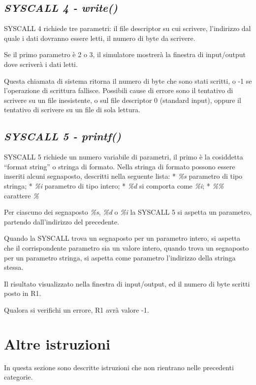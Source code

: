 \documentclass[letterpaper,10pt,italian]{sphinxmanual}
\begin{document}
\subsection{\emph{SYSCALL 4 - write()}}
\label{instructions:syscall-4-write}
SYSCALL 4 richiede tre parametri: il file descriptor su cui scrivere,
l'indirizzo dal quale i dati dovranno essere letti, il numero di byte da
scrivere.

Se il primo parametro è 2 o 3, il simulatore mostrerà la finestra di
input/output dove scriverà i dati letti.

Questa chiamata di sistema ritorna il numero di byte che sono stati scritti, o
-1 se l'operazione di scrittura fallisce.  Possibili cause di errore sono il
tentativo di scrivere su un file inesistente, o sul file descriptor 0
(standard input), oppure il tentativo di scrivere su un file di sola lettura.


\subsection{\emph{SYSCALL 5 - printf()}}
\label{instructions:syscall-5-printf}
SYSCALL 5 richiede un numero variabile di parametri, il primo è la
cosiddetta ``format string'' o stringa di formato. Nella stringa di formato
possono essere inseriti alcuni segnaposto, descritti nella seguente lista:
* \emph{\%s} parametro di tipo stringa;
* \emph{\%i} parametro di tipo intero;
* \emph{\%d} si comporta come \emph{\%i};
* \emph{\%\%} carattere \emph{\%}

Per ciascuno dei segnaposto \emph{\%s}, \emph{\%d} o \emph{\%i} la SYSCALL 5
si aspetta un parametro, partendo dall'indirizzo del precedente.

Quando la SYSCALL trova un segnaposto per un parametro intero, si aspetta che
il corrispondente parametro sia un valore intero, quando trova un segnaposto
per un parametro stringa, si aspetta come parametro l'indirizzo della stringa
stessa.

Il risultato  visualizzato nella finestra di input/output, ed il numero di
byte scritti posto in R1.

Qualora si verifichi un errore, R1 avrà valore -1.


\section{Altre istruzioni}
\label{instructions:altre-istruzioni}
In questa sezione sono descritte istruzioni che non rientrano nelle precedenti
categorie.
\end{document}
